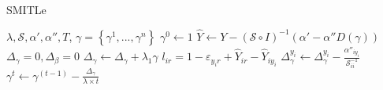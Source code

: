 \begin{algorithm}\label{alg:1}
       \caption{SMITLe}\label{alg:1}
        \begin{algorithmic}[1]
            \REQUIRE $\lambda, \mathcal{S},\alpha',\alpha'',T$,
            \ENSURE $\gamma=\left\{\gamma^1,...,\gamma^n\right\}$
            \STATE $\gamma^0 \leftarrow 1$
                \STATE $\hat Y \leftarrow Y - {\left( {\mathcal{S} \circ I} \right)^{ - 1}}\left( \alpha' - \alpha''D(\gamma) \right)$
                \STATE ${\Delta _\gamma }=0, {\Delta _\beta }=0$
                	\STATE ${\Delta _\gamma }\leftarrow {\Delta _\gamma }+\lambda_1\gamma$ 
	                    \STATE $l_{ir} = 1 - {\varepsilon _{{y_i}r}} + {\hat Y_{ir}} - {\hat Y_{i{y_i}}}$
	                            \STATE $\Delta _\gamma^{{y_i}} \leftarrow \Delta _\gamma^{{y_i}} - \frac{{{\alpha''_{i{y_i}}}}}{{{\mathcal{S}^{-1}_{ii}}}}$%
	                    \ENDIF
	                 \ENDFOR %
                \ENDFOR %
                \STATE $\gamma^t  \leftarrow \gamma^{(t-1)}  - \frac{{{\Delta _\gamma }}}{{\lambda\times {t} }}$
             \ENDFOR %
        \end{algorithmic}
\end{algorithm}